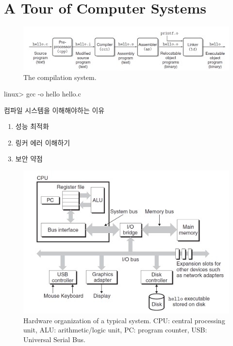 

\chapter{A Tour of Computer Systems}


\begin{figure}[h!]
    \centering
    \includegraphics[scale=0.3]{pic/section1and2/pic1}
    \caption{The compilation system.}
\end{figure}

linux> gcc -o hello hello.c

컴파일 시스템을 이해해야하는 이유

\begin{enumerate}
    \item 성능 최적화
    \item 링커 에러 이해하기
    \item 보안 약점
\end{enumerate}


\begin{figure}[h!]
    \centering
    \includegraphics[scale=0.5]{pic/section1and2/pic2}
    \caption{Hardware organization
    of a typical system. CPU:
    central processing unit,
    ALU: arithmetic/logic unit,
    PC: program counter, USB:
    Universal Serial Bus.}
\end{figure}


